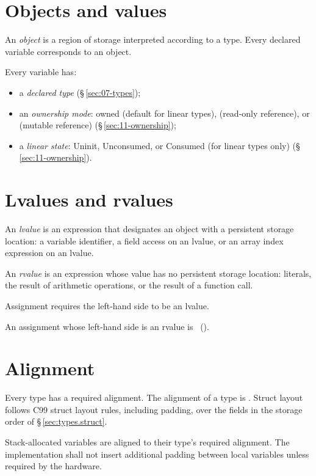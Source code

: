 \section{Objects and values}
\label{sec:basics.objects}

\pnum
An \textit{object} is a region of storage interpreted according to a type.
Every declared variable corresponds to an object.

\pnum
Every variable has:
\begin{itemize}
  \item a \textit{declared type} (\S\,\ref{sec:07-types});
  \item an \textit{ownership mode}: owned (default for linear types),
         (read-only reference), or  (mutable
        reference) (\S\,\ref{sec:11-ownership});
  \item a \textit{linear state}: Uninit, Unconsumed, or Consumed (for
        linear types only) (\S\,\ref{sec:11-ownership}).
\end{itemize}

\section{Lvalues and rvalues}
\label{sec:basics.lvalues}

\pnum
An \textit{lvalue} is an expression that designates an object with a
persistent storage location: a variable identifier, a field access on an
lvalue, or an array index expression on an lvalue.

\pnum
An \textit{rvalue} is an expression whose value has no persistent storage
location: literals, the result of arithmetic operations, or the result of
a function call.

\pnum
Assignment requires the left-hand side to be an lvalue.

\begin{constraint}
  An assignment whose left-hand side is an rvalue is
  \illformed{}~().
\end{constraint}

\section{Alignment}
\label{sec:basics.alignment}

\pnum
Every type has a required alignment.  The alignment of a type is
.
Struct layout follows C99 struct layout rules, including padding, over the fields in the
storage order of \S\,\ref{sec:types.struct}.

\pnum
Stack-allocated variables are aligned to their type's required alignment.
The implementation shall not insert additional padding between local
variables unless required by the hardware.
